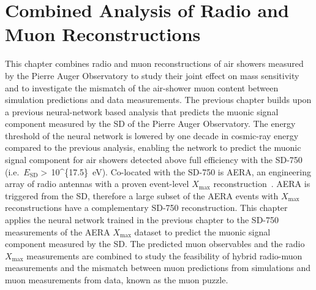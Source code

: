 %
%
\chapter{Combined Analysis of Radio and Muon Reconstructions}\label{chap:radiomuon}


This chapter combines radio and muon reconstructions of air showers measured by the Pierre Auger Observatory to study their joint effect on mass sensitivity and to investigate the mismatch of the air-shower muon content between simulation predictions and data measurements.
The previous chapter builds upon a previous neural-network based analysis that predicts the muonic signal component measured by the SD of the Pierre Auger Observatory.
The energy threshold of the neural network is lowered by one decade in cosmic-ray energy compared to the previous analysis, enabling the network to predict the muonic signal component for air showers detected above full efficiency with the SD-750 (i.e.~$E_{\text{SD}}>$\,\qty[parse-numbers=false]{10^{17.5}}{\electronvolt}).
Co-located with the SD-750 is AERA, an engineering array of radio antennas with a proven event-level $X_{\text{max}}$ reconstruction~\cite{auger_prd2024_aeraxmax,auger_prl2024_aeraxmax}.
AERA is triggered from the SD, therefore a large subset of the AERA events with $X_{\text{max}}$ reconstructions have a complementary SD-750 reconstruction.
This chapter applies the neural network trained in the previous chapter to the SD-750 measurements of the AERA $X_{\text{max}}$ dataset to predict the muonic signal component measured by the SD.
The predicted muon observables and the radio $X_{\text{max}}$ measurements are combined to study the feasibility of hybrid radio-muon measurements and the mismatch between muon predictions from simulations and muon measurements from data, known as the muon puzzle.  



